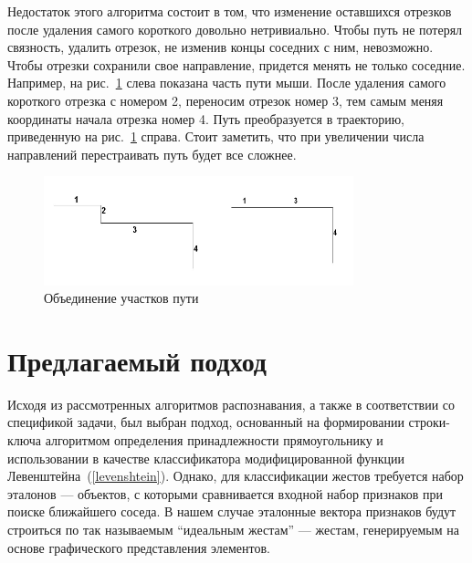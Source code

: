 \documentclass[a5paper]{article}
\begin{document}
Недостаток этого алгоритма состоит в том, что изменение оставшихся отрезков после удаления самого короткого довольно нетривиально. Чтобы путь не потерял связность, удалить отрезок, не изменив концы соседних с ним, невозможно. Чтобы отрезки сохранили свое направление, придется менять не только соседние. Например, на рис.~\ref{qt} слева показана часть пути мыши. После удаления самого короткого отрезка с номером 2, переносим отрезок номер 3, тем самым меняя координаты начала отрезка номер 4. Путь преобразуется в траекторию, приведенную на рис.~\ref{qt} справа. Стоит заметить, что при увеличении числа направлений перестраивать путь будет все сложнее. 

\begin{figure} [ht]
  \begin{center}
    \includegraphics[width=0.8\textwidth, bb=0 0 500 200]{04-qt.png}
    \caption{Объединение участков пути}
    \label{qt}
  \end{center}
\end{figure}

\section{Предлагаемый подход}
\label{rectAlgorithm}
Исходя из рассмотренных алгоритмов распознавания, а также в соответствии со спецификой задачи, был выбран подход, основанный на формировании строки-ключа алгоритмом определения принадлежности прямоугольнику и использовании в качестве классификатора модифицированной функции Левенштейна~(\ref{levenshtein}). Однако, для классификации жестов требуется набор эталонов --- объектов, с которыми сравнивается входной набор признаков при поиске ближайшего соседа. В нашем случае эталонные вектора признаков будут строиться по так называемым ``идеальным жестам'' --- жестам, генерируемым на основе графического представления элементов. 
\end{document}
